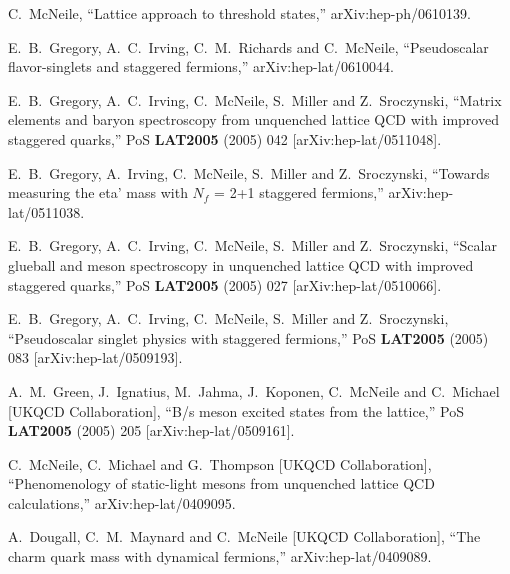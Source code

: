 \begin{thebibliography}{130}
  C.~McNeile,
  ``Lattice approach to threshold states,''
  arXiv:hep-ph/0610139.

  E.~B.~Gregory, A.~C.~Irving, C.~M.~Richards and C.~McNeile,
  ``Pseudoscalar flavor-singlets and staggered fermions,''
  arXiv:hep-lat/0610044.

E.~B.~Gregory, A.~C.~Irving, C.~McNeile, S.~Miller and Z.~Sroczynski,
``Matrix elements and baryon spectroscopy from unquenched lattice QCD
with improved staggered quarks,''
PoS {\bf LAT2005} (2005) 042
[arXiv:hep-lat/0511048].

E.~B.~Gregory, A.~Irving, C.~McNeile, S.~Miller and Z.~Sroczynski,
``Towards measuring the eta' mass with $N_f$ = 2+1 staggered
fermions,''
arXiv:hep-lat/0511038.

E.~B.~Gregory, A.~C.~Irving, C.~McNeile, S.~Miller and
Z.~Sroczynski,
``Scalar glueball and meson spectroscopy in unquenched lattice QCD
with
improved staggered quarks,''
PoS {\bf LAT2005} (2005) 027
[arXiv:hep-lat/0510066].

E.~B.~Gregory, A.~C.~Irving, C.~McNeile, S.~Miller and Z.~Sroczynski,
``Pseudoscalar singlet physics with staggered fermions,''
PoS {\bf LAT2005} (2005) 083
[arXiv:hep-lat/0509193].

A.~M.~Green, J.~Ignatius, M.~Jahma, J.~Koponen, C.~McNeile and
C.~Michael
                  [UKQCD Collaboration],
``B/s meson excited states from the lattice,''
PoS {\bf LAT2005} (2005) 205
[arXiv:hep-lat/0509161].


C.~McNeile, C.~Michael and G.~Thompson  [UKQCD Collaboration],
``Phenomenology of static-light mesons from unquenched lattice QCD
calculations,''
arXiv:hep-lat/0409095.



A.~Dougall, C.~M.~Maynard and C.~McNeile  [UKQCD Collaboration],
``The charm quark mass with dynamical fermions,''
arXiv:hep-lat/0409089.



\end{thebibliography}
